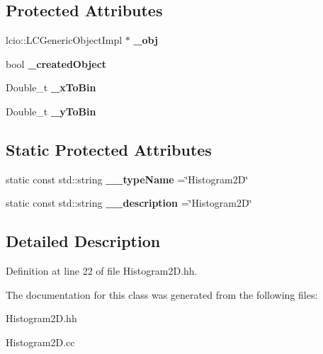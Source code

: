 \subsection*{Protected Attributes}
\begin{DoxyCompactItemize}
\item 
lcio\-::\-L\-C\-Generic\-Object\-Impl $\ast$ {\bfseries \-\_\-obj}\label{classhistmgr_1_1Histogram2D_ac665536e5e1b13a7482018306b70424d}

\item 
bool {\bfseries \-\_\-created\-Object}\label{classhistmgr_1_1Histogram2D_a5e72c0d4241393ceda4f54a441cc9d72}

\item 
Double\-\_\-t {\bfseries \-\_\-x\-To\-Bin}\label{classhistmgr_1_1Histogram2D_aee7de840bafcc507ff2cf1165ad97c53}

\item 
Double\-\_\-t {\bfseries \-\_\-y\-To\-Bin}\label{classhistmgr_1_1Histogram2D_af65c161601e9290bc97be2f8debbecd8}

\end{DoxyCompactItemize}
\subsection*{Static Protected Attributes}
\begin{DoxyCompactItemize}
\item 
static const std\-::string {\bfseries \-\_\-\-\_\-type\-Name} =\char`\"{}Histogram2\-D\char`\"{}\label{classhistmgr_1_1Histogram2D_ae180a84a85576bfe6648db62f402d42e}

\item 
static const std\-::string {\bfseries \-\_\-\-\_\-description} =\char`\"{}Histogram2\-D\char`\"{}\label{classhistmgr_1_1Histogram2D_a0d54044cca0f5111309d9a22481b6236}

\end{DoxyCompactItemize}


\subsection{Detailed Description}


Definition at line 22 of file Histogram2\-D.\-hh.



The documentation for this class was generated from the following files\-:\begin{DoxyCompactItemize}
\item 
Histogram2\-D.\-hh\item 
Histogram2\-D.\-cc\end{DoxyCompactItemize}
